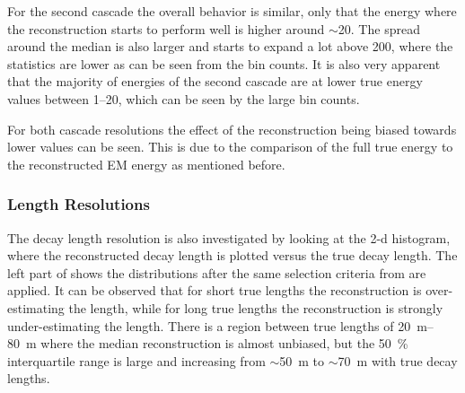 For the second cascade the overall behavior is similar, only that the energy where the reconstruction starts to perform well is higher around $\sim$\SI{20}{\gev}. The spread around the median is also larger and starts to expand a lot above \SI{200}{\gev}, where the statistics are lower as can be seen from the bin counts. It is also very apparent that the majority of energies of the second cascade are at lower true energy values between \SIrange[range-phrase=~and~]{1}{20}{\gev}, which can be seen by the large bin counts.

For both cascade resolutions the effect of the reconstruction being biased towards lower values can be seen. This is due to the comparison of the full true energy to the reconstructed EM energy as mentioned before.


\subsubsection{Length Resolutions} 

The decay length resolution is also investigated by looking at the 2-d histogram, where the reconstructed decay length is plotted versus the true decay length. The left part of  shows the distributions after the same selection criteria from  are applied. It can be observed that for short true lengths the reconstruction is over-estimating the length, while for long true lengths the reconstruction is strongly under-estimating the length. There is a region between true lengths of \SIrange[range-phrase=~and~]{20}{80}{\meter} where the median reconstruction is almost unbiased, but the \SI{50}{\percent} interquartile range is large and increasing from $\sim$\SI{50}{\meter} to $\sim$\SI{70}{\meter} with true decay lengths.

